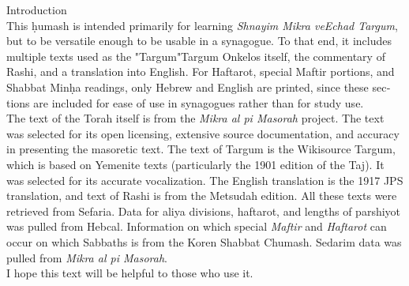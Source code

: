 \tableofcontents
\clearpage
{}	
\begin{minipage}{\textwidth}\englishfont
	
\begin{english}
\vspace{16pt}
\Large Introduction\vspace{12pt}\\
\normalsize
This \d{h}umash is intended primarily for learning \textit{Shnayim Mikra veEchad Targum}, but to be versatile enough to be usable in a synagogue. To that end, it includes multiple texts used as the "Targum"\textemdash Targum Onkelos itself, the commentary of Rashi, and a translation into English.  For Haftarot, special Maftir portions, and Shabbat Min\d{h}a readings, only Hebrew and English are printed, since these sections are included for ease of use in synagogues rather than for study use.\\

The text of the Torah itself is from the \textit{Mikra al pi Masorah} project. The text was selected for its open licensing, extensive source documentation, and accuracy in presenting the masoretic text.  The text of Targum is the Wikisource Targum, which is based on Yemenite texts (particularly the 1901 edition of the Taj). It was selected for its accurate vocalization.
The English translation is the 1917 JPS translation, and text of Rashi is from the Metsudah edition.  All these texts were retrieved from Sefaria. Data for aliya divisions, haftarot, and lengths of parshiyot was pulled from Hebcal. Information on which special \textit{Maftir} and \textit{Haftarot} can occur on which Sabbaths is from the Koren Shabbat Chumash. Sedarim data was pulled from \textit{Mikra al pi Masorah}.\\

I hope this text will be helpful to those who use it.

\end{english}

\end{minipage}

